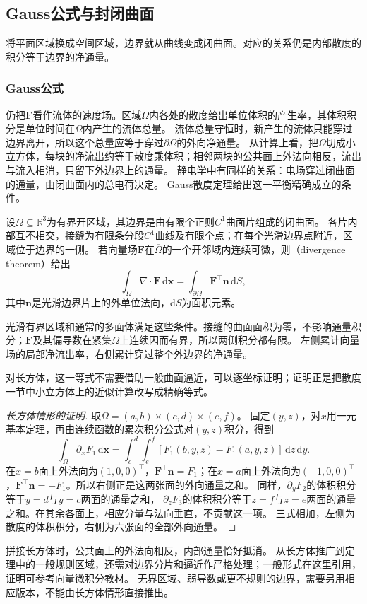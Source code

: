\subsection{Gauss公式与封闭曲面}

将平面区域换成空间区域，边界就从曲线变成闭曲面。对应的关系仍是内部散度的积分等于边界的净通量。

\subsubsection{Gauss公式}

仍把$\bm F$看作流体的速度场。区域$\Omega$内各处的散度给出单位体积的产生率，其体积积分是单位时间在$\Omega$内产生的流体总量。
流体总量守恒时，新产生的流体只能穿过边界离开，所以这个总量应等于穿过$\partial\Omega$的外向净通量。
从计算上看，把$\Omega$切成小立方体，每块的净流出约等于散度乘体积；相邻两块的公共面上外法向相反，流出与流入相消，只留下外边界上的通量。
静电学中有同样的关系：电场穿过闭曲面的通量，由闭曲面内的总电荷决定。
Gauss散度定理给出这一平衡精确成立的条件。
\begin{theorem}[Gauss散度定理]
\label{thm:analysis-divergence-theorem}
设$\Omega\subseteq\mathbb R^3$为有界开区域，其边界是由有限个正则$C^1$曲面片组成的闭曲面。
各片内部互不相交，接缝为有限条分段$C^1$曲线及有限个点；在每个光滑边界点附近，区域位于边界的一侧。
若向量场$\bm F$在$\overline\Omega$的一个开邻域内连续可微，则（divergence theorem）给出
\begin{equation}
  \int_{\Omega}\nabla\mathbin{\cdot}\bm F\,\mathrm d\bm x
  =\int_{\partial\Omega}\bm F^\top\bm n\,\mathrm dS,
 \label{eq:analysis-divergence-theorem}
\end{equation}
其中$\bm n$是光滑边界片上的外单位法向，$\mathrm dS$为面积元素。
\end{theorem}
光滑有界区域和通常的多面体满足这些条件。接缝的曲面面积为零，不影响通量积分；$\bm F$及其偏导数在紧集$\overline\Omega$上连续因而有界，所以两侧积分都有限。
左侧累计向量场的局部净流出率，右侧累计穿过整个外边界的净通量。

对长方体，这一等式不需要借助一般曲面逼近，可以逐坐标证明；证明正是把散度一节中小立方体上的近似计算改写成精确等式。
\begin{proof}[长方体情形的证明]
取$\Omega=(a,b)\times(c,d)\times(e,f)$。
固定$(y,z)$，对$x$用一元基本定理，再由连续函数的累次积分公式对$(y,z)$积分，得到
\[
 \int_\Omega\partial_xF_1\,\mathrm d\bm x
 =\int_c^d\int_e^f
   [F_1(b,y,z)-F_1(a,y,z)]\,\mathrm dz\,\mathrm dy.
\]
在$x=b$面上外法向为$(1,0,0)^\top$，$\bm F^\top\bm n=F_1$；在$x=a$面上外法向为$(-1,0,0)^\top$，$\bm F^\top\bm n=-F_1$。所以右侧正是这两张面的外向通量之和。
同样，$\partial_yF_2$的体积积分等于$y=d$与$y=c$两面的通量之和，
$\partial_zF_3$的体积积分等于$z=f$与$z=e$两面的通量之和。在其余各面上，相应分量与法向垂直，不贡献这一项。
三式相加，左侧为散度的体积积分，右侧为六张面的全部外向通量。
\end{proof}
拼接长方体时，公共面上的外法向相反，内部通量恰好抵消。
从长方体推广到定理中的一般规则区域，还需对边界分片和逼近作严格处理；一般形式在这里引用，证明可参考向量微积分教材。
无界区域、弱导数或更不规则的边界，需要另用相应版本，不能由长方体情形直接推出。


